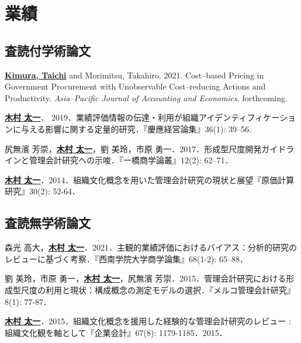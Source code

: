 \documentclass[letterpaper,uplatex]{article}
\renewenvironment{itemize}{
  \begin{list}{}{
    \setlength{\leftmargin}{1.5em}
  }
}{
  \end{list}
}
\begin{document}
\section*{業績}

\subsection*{査読付学術論文}

\begin{itemize}
    \item \underline{\textbf{Kimura, Taichi}} and Morimitsu, Takahiro. 2021. Cost--based Pricing in Government Procurement with Unobservable Cost--reducing Actions and Productivity. \textit{Asia--Pacific Journal of Accounting and Economics}, forthcoming.
    
    \item \underline{\textbf{木村 太一}}． 2019．業績評価情報の伝達・利用が組織アイデンティフィケーションに与える影響に関する定量的研究．『慶應経営論集』36(1): 39--56.

	\item 尻無濱 芳崇，\underline{\textbf{木村 太一}}，劉 美玲，市原 勇一．2017．形成型尺度開発ガイドラインと管理会計研究への示唆．『一橋商学論叢』12(2): 62--71．

	\item \underline{\textbf{木村 太一}}．2014．組織文化概念を用いた管理会計研究の現状と展望『原価計算研究』30(2): 52-64．
\end{itemize}

\subsection*{査読無学術論文}

\begin{itemize}
    \item 森光 高大，\underline{\textbf{木村 太一}}．2021．主観的業績評価におけるバイアス：分析的研究のレビューに基づく考察．『西南学院大学商学論集』68(1-2): 65--88．
    
	\item 劉 美玲，市原 勇一，\underline{\textbf{木村 太一}}，尻無濱 芳崇．2015．管理会計研究における形成型尺度の利用と現状：構成概念の測定モデルの選択．『メルコ管理会計研究』8(1): 77-87．

	\item \underline{\textbf{木村 太一}}．2015．組織文化概念を援用した経験的な管理会計研究のレビュー : 組織文化観を軸として『企業会計』67(8): 1179-1185．2015．
\end{itemize}
\end{document}
